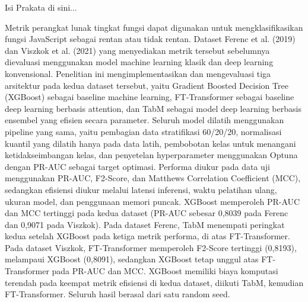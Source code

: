 \documentclass[skripsi,inggris]{ugmskripsi}
\DeclareRobustCommand{\_}{\ifmmode\mbox{\textunderscore}\else\textunderscore\allowbreak\fi}
\begin{document}
\cover
\titlepageind
\titlepageeng
\approvalpage
\declarepage
\motto
\acknowledment

\preface
{}
Isi Prakata di sini...

\tableofcontents
\listoftables
\listoffigures

\abstractind

Metrik perangkat lunak tingkat fungsi dapat digunakan untuk mengklasifikasikan fungsi JavaScript sebagai rentan atau tidak rentan. Dataset Ferenc et al. (2019) dan Viszkok et al. (2021) yang menyediakan metrik tersebut sebelumnya dievaluasi menggunakan model machine learning klasik dan deep learning konvensional. Penelitian ini mengimplementasikan dan mengevaluasi tiga arsitektur pada kedua dataset tersebut, yaitu Gradient Boosted Decision Tree (XGBoost) sebagai baseline machine learning, FT-Transformer sebagai baseline deep learning berbasis attention, dan TabM sebagai model deep learning berbasis ensembel yang efisien secara parameter. Seluruh model dilatih menggunakan pipeline yang sama, yaitu pembagian data stratifikasi 60/20/20, normalisasi kuantil yang dilatih hanya pada data latih, pembobotan kelas untuk menangani ketidakseimbangan kelas, dan penyetelan hyperparameter menggunakan Optuna dengan PR-AUC sebagai target optimasi. Performa diukur pada data uji menggunakan PR-AUC, F2-Score, dan Matthews Correlation Coefficient (MCC), sedangkan efisiensi diukur melalui latensi inferensi, waktu pelatihan ulang, ukuran model, dan penggunaan memori puncak. XGBoost memperoleh PR-AUC dan MCC tertinggi pada kedua dataset (PR-AUC sebesar 0,8039 pada Ferenc dan 0,9071 pada Viszkok). Pada dataset Ferenc, TabM menempati peringkat kedua setelah XGBoost pada ketiga metrik performa, di atas FT-Transformer. Pada dataset Viszkok, FT-Transformer memperoleh F2-Score tertinggi (0,8193), melampaui XGBoost (0,8091), sedangkan XGBoost tetap unggul atas FT-Transformer pada PR-AUC dan MCC. XGBoost memiliki biaya komputasi terendah pada keempat metrik efisiensi di kedua dataset, diikuti TabM, kemudian FT-Transformer. Seluruh hasil berasal dari satu random seed.

\endabstractind

\abstracteng
\end{document}
